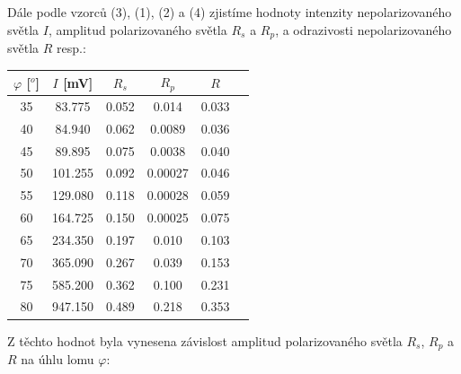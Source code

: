 \documentclass[a4paper,11pt]{article}
\begin{document}
    \newpage
    \begin{minipage}[t]{0.5\textwidth} 
                \vspace{-90pt}
                Dále podle vzorců (3), (1), (2) a (4) zjistíme hodnoty intenzity nepolarizovaného světla $I$, amplitud polarizovaného světla $R_s$ a $R_p$, a odrazivosti nepolarizovaného světla $R$ resp.:
                \vspace{10pt}
                \par \centering
                \begin{tabular}{|c|c|c|c|c|c}
                    \hline
                    $\varphi$ [$^o$] & $I$ [mV] &  $R_s$  & $R_p$ & $R$\\
                    \hline
                    35 & 83.775 & 0.052 & 0.014 & 0.033 \\
                    \hline
                    40 & 84.940 & 0.062 & 0.0089 & 0.036 \\
                    \hline
                    45 & 89.895 & 0.075 & 0.0038 & 0.040 \\
                    \hline
                    50 & 101.255 & 0.092 & 0.00027 & 0.046 \\
                    \hline
                    55 & 129.080 & 0.118 & 0.00028 & 0.059 \\
                    \hline
                    60 & 164.725 & 0.150 & 0.00025 & 0.075 \\
                    \hline
                    65 & 234.350 & 0.197 & 0.010 & 0.103 \\
                    \hline
                    70 & 365.090 & 0.267 & 0.039 & 0.153 \\
                    \hline
                    75 & 585.200 & 0.362 & 0.100 & 0.231 \\
                    \hline
                    80 & 947.150 & 0.489 & 0.218 & 0.353 \\
                    \hline
                \end{tabular}
                \captionsetup{justification=centering, font=footnotesize}
                \vspace{10pt}
                \raggedright
                \par Z těchto hodnot byla vynesena závislost amplitud polarizovaného světla $R_s$, $R_p$ a $R$ na úhlu lomu $\varphi$: 

\end{minipage}
\end{document}
